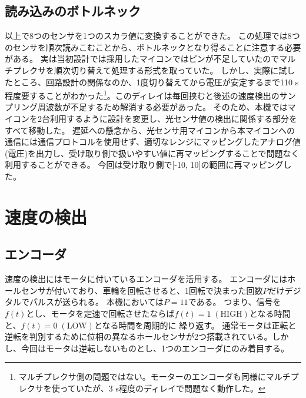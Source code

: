 \documentclass{ltjsreport}
\begin{document}
\subsection{読み込みのボトルネック}
以上で8つのセンサを1つのスカラ値に変換することができた。
この処理では8つのセンサを順次読みこむことから、ボトルネックとなり得ることに注意する必要がある。
実は当初設計では採用したマイコンではピンが不足していたのでマルチプレクサを順次切り替えて処理する形式を取っていた。
しかし、実際に試したところ、回路設計の関係なのか、1度切り替えてから電圧が安定するまで110 \mu s 程度要することがわかった\footnote{マルチプレクサ側の問題ではない。モーターのエンコーダも同様にマルチプレクサを使っていたが、3 \mu s程度のディレイで問題なく動作した。}。このディレイは毎回挟むと後述の速度検出のサンプリング周波数が不足するため解消する必要があった。
そのため、本機ではマイコンを2台利用するように設計を変更し、光センサ値の検出に関係する部分をすべて移動した。
遅延への懸念から、光センサ用マイコンから本マイコンへの通信には通信プロトコルを使用せず、適切なレンジにマッピングしたアナログ値(電圧)を出力し、受け取り側で扱いやすい値に再マッピングすることで問題なく利用することができる。
今回は受け取り側で[-10, 10]の範囲に再マッピングした。

\section{速度の検出}
\subsection{エンコーダ}
速度の検出にはモータに付いているエンコーダを活用する。
エンコーダにはホールセンサが付いており、車輪を回転させると、1回転で決まった回数$P$だけデジタルでパルスが送られる。
本機においては$P=11$である。
つまり、信号を$f(t)$とし、モータを定速で回転させたならば$f(t)=1 \; \mathrm{(HIGH)}$となる時間と、$f(t)=0 \; \mathrm{(LOW)}$となる時間を周期的に
繰り返す。
通常モータは正転と逆転を判別するために位相の異なるホールセンサが2つ搭載されている。しかし、今回はモータは逆転しないものとし、1つのエンコーダにのみ着目する。
\end{document}

